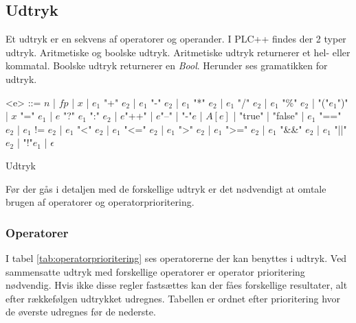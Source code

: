 \subsection{Udtryk}
Et udtryk er en sekvens af operatorer og operander. I PLC++ findes der 2 typer udtryk. Aritmetiske og boolske udtryk. Aritmetiske udtryk returnerer et hel- eller kommatal. Boolske udtryk returnerer en \textit{Bool}. Herunder ses gramatikken for udtryk.

\begin{Grammar}
 \begin{grammar}

 <e> ::= $n$ | $fp$ | $x$  | $e_1$ "+" $e_2$ | $e_1$ "-" $e_2$ | $e_1$ "*" $e_2$ | $e_1$ "/" $e_2$ | $e_1$ "\%" $e_2$ | "("$e_1$")" | $x$ "=" $e_1$ | $e$ "?" $e_1$ ":" $e_2$ | $e$"++" | $e$"--" | "-"$e$ | $A[e]$ | "true" | "false" | $e_1$ "==" $e_2$ | $e_1$ != $e_2$ | $e_1$ "<" $e_2$ | $e_1$ "<=" $e_2$ | $e_1$ ">" $e_2$ | $e_1$ ">=" $e_2$ | $e_1$ "\&\&" $e_2$ | $e_1$ "||" $e_2$ | "!"$e_1$ | $\epsilon$

 \end{grammar}
 \caption{Udtryk}\label{gra:expressions}
\end{Grammar}

\noindent Før der gås i detaljen med de forskellige udtryk er det nødvendigt at omtale brugen af operatorer og operatorprioritering.

\subsubsection{Operatorer}
I tabel \ref{tab:operatorprioritering} ses operatorerne der kan benyttes i udtryk. Ved sammensatte udtryk med forskellige operatorer er operator prioritering nødvendig. Hvis ikke disse regler fastsættes kan der fåes forskellige resultater, alt efter rækkefølgen udtrykket udregnes. Tabellen er ordnet efter prioritering hvor de øverste udregnes før de nederste.

